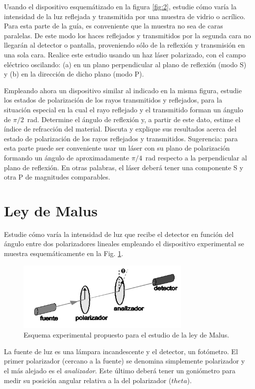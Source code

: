 \documentclass[laboratorio]{guia}
\begin{document}
Usando el dispositivo esquemátizado en la figura \ref{fig:2}, estudie cómo varía la intensidad de la luz reflejada y transmitida por una muestra de vidrio o acrílico.
Para esta parte de la guía, es conveniente que la muestra no sea de caras paralelas.
De este modo los haces reflejados y transmitidos por la segunda cara no llegarán al detector o pantalla, proveniendo sólo de la reflexión y transmisión en una sola cara.
Realice este estudio usando un haz láser polarizado, con el campo eléctrico oscilando: (a) en un plano perpendicular al plano de reflexión (modo S) y (b) en la dirección de dicho plano (modo P).

Empleando ahora un dispositivo similar al indicado en la misma figura, estudie los estados de polarización de los rayos transmitidos y reflejados, para la situación especial en la cual el rayo reflejado y el transmitido forman un ángulo de \(\pi/2\)~rad.
Determine el ángulo de reflexión y, a partir de este dato, estime el índice de refracción del material. 
Discuta y explique sus resultados acerca del estado de polarización de los rayos reflejados y transmitidos.
Sugerencia: para esta parte puede ser conveniente usar un láser con su plano de polarización formando un ángulo de aproximadamente \(\pi/4\)~rad respecto a la perpendicular al plano de reflexión.
En otras palabras, el láser deberá tener una componente S y otra P de magnitudes comparables.


\section{Ley de Malus}
Estudie cómo varía la intensidad de luz que recibe el detector en función del ángulo entre dos polarizadores lineales empleando el dispositivo experimental se muestra esquem\'aticamente en la Fig. \ref{fig:Malus}.

\begin{figure}[ht]
  \centering
  \includegraphics[width=8.5cm]{LG12--000.png}
  \caption{Esquema experimental propuesto para el estudio de la ley de Malus.}
  \label{fig:Malus}
\end{figure}

La fuente de luz es una lámpara incandescente y el detector, un fotómetro.
El primer polarizador (cercano a la fuente) se denomina simplemente polarizador y el más alejado es el \emph{analizador}.
Este último deberá tener un goniómetro para medir su posición angular relativa a la del polarizador (\(theta\)).
\end{document}
